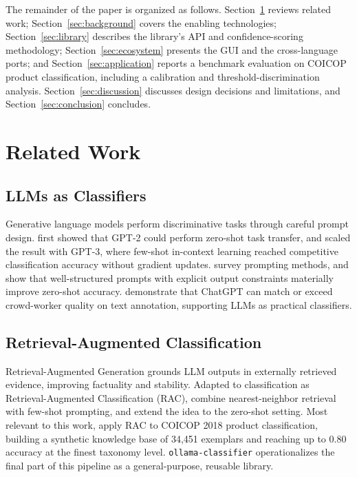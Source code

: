 \documentclass[11pt,a4paper]{article}
\begin{document}
The remainder of the paper is organized as follows.
Section~\ref{sec:related} reviews related work; Section~\ref{sec:background}
covers the enabling technologies; Section~\ref{sec:library} describes the
library's API and confidence-scoring methodology; Section~\ref{sec:ecosystem}
presents the GUI and the cross-language ports; and
Section~\ref{sec:application} reports a benchmark evaluation on COICOP
product classification, including a calibration and threshold-discrimination
analysis. Section~\ref{sec:discussion} discusses design decisions and
limitations, and Section~\ref{sec:conclusion} concludes.

\section{Related Work}
\label{sec:related}

\subsection{LLMs as Classifiers}

Generative language models perform discriminative tasks through careful
prompt design. \citet{radford2019gpt2} first showed that GPT-2 could perform
zero-shot task transfer, and \citet{brown2020language} scaled the result with
GPT-3, where few-shot in-context learning reached competitive classification
accuracy without gradient updates. \citet{liu2023preliminary} survey prompting
methods, and \citet{mu2024prompt} show that well-structured prompts with
explicit output constraints materially improve zero-shot accuracy.
\citet{gilardi2023chatgpt} demonstrate that ChatGPT can match or exceed
crowd-worker quality on text annotation, supporting LLMs as practical
classifiers.

\subsection{Retrieval-Augmented Classification}

Retrieval-Augmented Generation \citep{lewis2020retrieval} grounds LLM outputs
in externally retrieved evidence, improving factuality and stability. Adapted
to classification as Retrieval-Augmented Classification (RAC),
\citet{yu2023retrieval} combine nearest-neighbor retrieval with few-shot
prompting, and \citet{abdullahi2024retrieval} extend the idea to the
zero-shot setting. Most relevant to this work, \citet{nunes2025rac} apply RAC
to COICOP 2018 product classification, building a synthetic knowledge base of
34{,}451 exemplars and reaching up to 0.80 accuracy at the finest taxonomy
level. \texttt{ollama-classifier} operationalizes the final part of this pipeline as a
general-purpose, reusable library.
\end{document}
